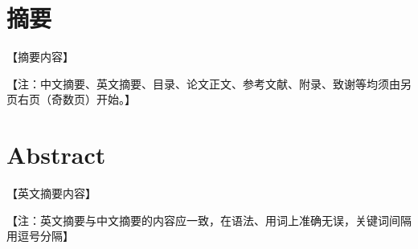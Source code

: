 
\maketitle%
\MAKETITLE%
\makedeclaration%
\intobmk\chapter*{摘\quad 要}%
\setcounter{page}{1}%

【摘要内容】

【注：中文摘要、英文摘要、目录、论文正文、参考文献、附录、致谢等均须由另页右页（奇数页）开始。】

\intobmk\chapter*{Abstract}%

【英文摘要内容】

【注：英文摘要与中文摘要的内容应一致，在语法、用词上准确无误，关键词间隔用逗号分隔】


\pagestyle{enfrontmatterstyle}%
\cleardoublepage\pagestyle{frontmatterstyle}%

